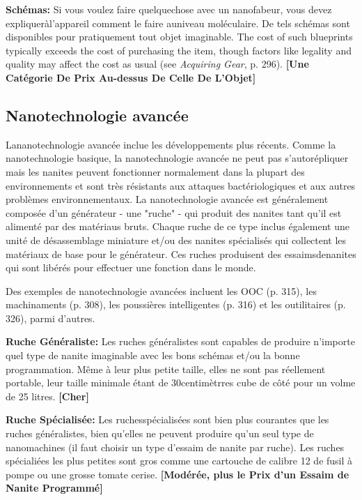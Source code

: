 \textbf{Schémas:} Si vous voulez faire quelquechose avec un nanofabeur, vous devez expliqueràl'appareil comment le faire auniveau moléculaire. De tels schémas sont disponibles pour pratiquement tout objet imaginable. The cost of such blueprints typically exceeds the cost of purchasing the item, though factors like legality and quality may affect the cost as usual (see \emph{Acquiring Gear}, p. 296). \textbf{[Une Catégorie De Prix Au-dessus De Celle De L'Objet]} 



\subsection{Nanotechnologie avancée} \label{sec:advanced-nanotech} 

Lananotechnologie avancée inclue les développements plus récents. Comme la nanotechnologie basique, la nanotechnologie avancée ne peut pas s'autorépliquer mais les nanites peuvent fonctionner normalement dans la plupart des environnements et sont très résistants aux attaques bactériologiques et aux autres problèmes environnementaux. La nanotechnologie avancée est généralement composée d'un générateur - une "ruche" - qui produit des nanites tant qu'il est alimenté par des matériaus bruts. Chaque ruche de ce type inclus également une unité de désassemblage miniature et/ou des nanites spécialisés qui collectent les matériaux de base pour le générateur. Ces ruches produisent des essaimsdenanites qui sont libérés pour effectuer une fonction dans le monde. 

Des exemples de nanotechnologie avancées incluent les OOC (p. 315), les machinaments (p. 308), les poussières intelligentes (p. 316) et les outilitaires (p. 326), parmi d'autres. 

\textbf{Ruche Généraliste:} Les ruches généralistes sont capables de produire n'importe quel type de nanite imaginable avec les bons schémas et/ou la bonne programmation. Même à leur plus petite taille, elles ne sont pas réellement portable, leur taille minimale étant de 30centimètrres cube de côté pour un volme de 25 litres. \textbf{[Cher]} 

\textbf{Ruche Spécialisée:} Les ruchesspécialisées sont bien plus courantes que les ruches généralistes, bien qu'elles ne peuvent produire qu'un seul type de nanomachines (il faut choisir un type d'essaim de nanite par ruche). Les ruches spécialiées les plus petites sont gros comme une cartouche de calibre 12 de fusil à pompe ou une grosse tomate cerise. \textbf{[Modérée, plus le Prix d'un Essaim de Nanite Programmé]} 

